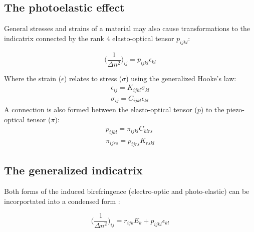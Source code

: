 \subsection{The photoelastic effect}

General stresses and strains of a material may also cause transformations to the indicatrix connected by the rank 4 elasto-optical tensor $p_{i j k l}$:

\begin{equation}
 \bigg( \frac{1}{\Delta n^2} \bigg)_{ij} = p_{ijkl} \epsilon_{kl}
\end{equation}

\noindent Where the strain ({\boldmath$\epsilon$}) relates to stress ({\boldmath$\sigma$}) using the generalized Hooke's law: 
\begin{equation}\label{eq:genhookeslaw} 
 \begin{split}
	 \epsilon_{ij} = K_{ijkl} \sigma_{kl}
	 \\
	 \sigma_{ij} = C_{ijkl} \epsilon_{kl}
 \end{split}
\end{equation}
A connection is also formed between the elasto-optical tensor ({\boldmath$p$}) to the piezo-optical tensor ({\boldmath$\pi$}): 
\begin{equation}\label{eq:indicgenelastooptical}
 \begin{split}
	p_{ijkl} = \pi_{ijkl} C_{klrs}
	\\
	\pi_{ijrs} = p_{ijrs} K_{rskl}
 \end{split}
\end{equation}

\subsection{The generalized indicatrix}
Both forms of the induced birefringence (electro-optic and photo-elastic) can be incorportated into a condensed form \cite{nye}:

\begin{equation}\label{eq:indicgen}
	\bigg( \frac{1}{\Delta n^2} \bigg)_{ij} = r_{ijk}E_k + p_{ijkl} \epsilon_{kl}
\end{equation}


